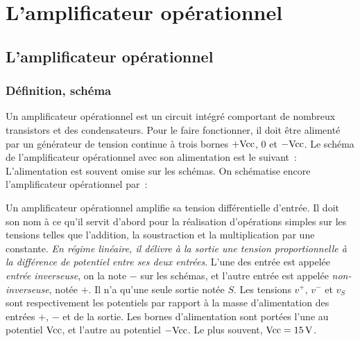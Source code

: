 \chapter{L'amplificateur opérationnel}%
\minitoc{}
\minilof{}
\minilot{}
%
\section{L'amplificateur opérationnel}%
\subsection{Définition, schéma}%
Un amplificateur opérationnel est un circuit intégré comportant de nombreux 
transistors et des condensateurs. Pour le faire fonctionner, il doit être 
alimenté par un générateur de tension continue à trois bornes \(+\textrm{Vcc}\), \(0\) 
et \(-\textrm{Vcc}\). Le schéma de l'amplificateur opérationnel avec son alimentation 
est le suivant~:
L'alimentation est souvent omise sur les schémas. On schématise encore 
l'amplificateur opérationnel par~:

Un amplificateur opérationnel amplifie sa tension différentielle d'entrée. Il 
doit son nom à ce qu'il servit d'abord pour la réalisation d'opérations simples 
sur les tensions telles que l'addition, la soustraction et la multiplication 
par une constante. \emph{En régime linéaire, il délivre à la sortie une tension 
proportionnelle à la différence de potentiel entre ses deux entrées}. L'une des 
entrée est appelée \emph{entrée inverseuse}, on la note \(-\) sur les schémas, 
et l'autre entrée est appelée \emph{non-inverseuse}, notée \(+\). Il n'a qu'une 
seule sortie notée \(S\). Les tensions \(v^+\), \(v^-\) et \(v_S\) sont 
respectivement les potentiels par rapport à la masse d'alimentation des entrées 
\(+\), \(-\) et de la sortie. Les bornes d'alimentation sont portées l'une au 
potentiel \(\textrm{Vcc}\), et l'autre au potentiel \(-\textrm{Vcc}\). Le plus souvent, \(\textrm{Vcc} 
= \SI{15}{\volt}\).
